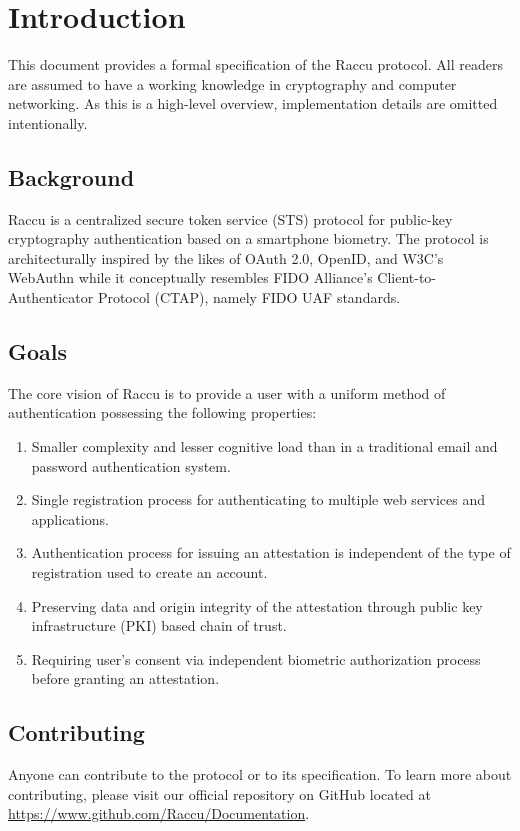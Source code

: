 \section{Introduction}
This document provides a formal specification of the Raccu protocol. All readers are assumed to have a working 
knowledge in cryptography and computer networking. As this is a high-level overview, implementation details are 
omitted intentionally.

    \subsection{Background}
    Raccu is a centralized secure token service (STS) protocol for public-key cryptography authentication 
    based on a smartphone biometry. The protocol is architecturally inspired by the likes of OAuth 2.0, OpenID, 
    and W3C's WebAuthn while it conceptually resembles FIDO Alliance's Client-to-Authenticator Protocol (CTAP), 
    namely FIDO UAF standards.

    \subsection{Goals}
    The core vision of Raccu is to provide a user with a uniform method of authentication possessing the 
    following properties: 
        \begin{enumerate}
            \item Smaller complexity and lesser cognitive load than in a traditional email and password 
                  authentication system.
            \item Single registration process for authenticating to multiple web services and applications.
            \item Authentication process for issuing an attestation is independent of the type of registration 
                  used to create an account.
            \item Preserving data and origin integrity of the attestation through public key infrastructure (PKI) 
                  based chain of trust.
            \item Requiring user's consent via independent biometric authorization process before granting an 
                  attestation.
        \end{enumerate}

     \subsection{Contributing}
     Anyone can contribute to the protocol or to its specification. To learn more about contributing, please visit our 
     official repository on GitHub located at \href{https://www.github.com/Raccu/Documentation}{https://www.github.com/Raccu/Documentation}.

